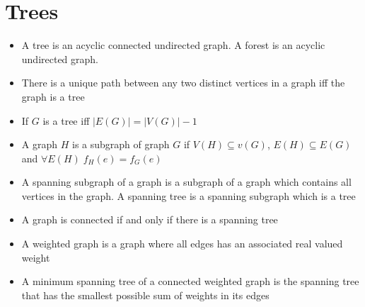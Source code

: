 \documentclass[11pt, twocolumn]{article}
\newenvironment{compactitem}
{\begin{itemize}
  \setlength{\itemsep}{1px}
  \setlength{\parskip}{0pt}
  \setlength{\parsep}{0pt}}
{\end{itemize}}
\begin{document}
\section{Trees}
\begin{compactitem}
\item A tree is an acyclic connected undirected graph. A forest is an acyclic undirected graph.
\item There is a unique path between any two distinct vertices in a graph iff the graph is a tree
\item If $G$ is a tree iff $|E(G)| = |V(G)|-1$
\item A graph $H$ is a subgraph of graph $G$ if $V(H)\subseteq v(G)$, $E(H) \subseteq E(G)$ and $\forall E(H)\; f_H(e) = f_G(e)$
\item A spanning subgraph of a graph is a subgraph of a graph which contains all vertices in the graph. A spanning tree is a spanning subgraph which is a tree
\item A graph is connected if and only if there is a spanning tree
\item A weighted graph is a graph where all edges has an associated real valued weight
\item A minimum spanning tree of a connected weighted graph is the spanning tree that has the smallest possible sum of weights in its edges
\end{compactitem}
\end{document}
